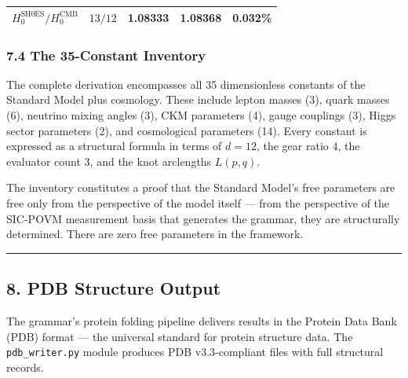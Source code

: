 \documentclass[12pt,a4paper]{article}
\begin{document}
\begin{longtable}[]{@{}lllll@{}}
\begin{minipage}[t]{0.13\columnwidth}
\(H_0^{\text{SH0ES}}/H_0^{\text{CMB}}\)\strut
\end{minipage} & \begin{minipage}[t]{0.25\columnwidth}\raggedright
\(13/12\)\strut
\end{minipage} & \begin{minipage}[t]{0.20\columnwidth}\raggedright
1.08333\strut
\end{minipage} & \begin{minipage}[t]{0.21\columnwidth}\raggedright
1.08368\strut
\end{minipage} & \begin{minipage}[t]{0.07\columnwidth}\raggedright
0.032\%\strut
\end{minipage}\tabularnewline
\bottomrule
\end{longtable}

\hypertarget{the-35-constant-inventory}{%
\subsubsection{7.4 The 35-Constant
Inventory}\label{the-35-constant-inventory}}

The complete derivation encompasses all 35 dimensionless constants of
the Standard Model plus cosmology. These include lepton masses (3),
quark masses (6), neutrino mixing angles (3), CKM parameters (4), gauge
couplings (3), Higgs sector parameters (2), and cosmological parameters
(14). Every constant is expressed as a structural formula in terms of
\(d=12\), the gear ratio \(4\), the evaluator count \(3\), and the knot
arclengths \(L(p,q)\).

The inventory constitutes a proof that the Standard Model's free
parameters are free only from the perspective of the model itself ---
from the perspective of the SIC-POVM measurement basis that generates
the grammar, they are structurally determined. There are zero free
parameters in the framework.

\begin{center}\rule{0.5\linewidth}{0.5pt}\end{center}

\hypertarget{pdb-structure-output}{%
\subsection{8. PDB Structure Output}\label{pdb-structure-output}}

The grammar's protein folding pipeline delivers results in the Protein
Data Bank (PDB) format --- the universal standard for protein structure
data. The \texttt{pdb\_writer.py} module produces PDB v3.3-compliant
files with full structural records.
\end{document}
